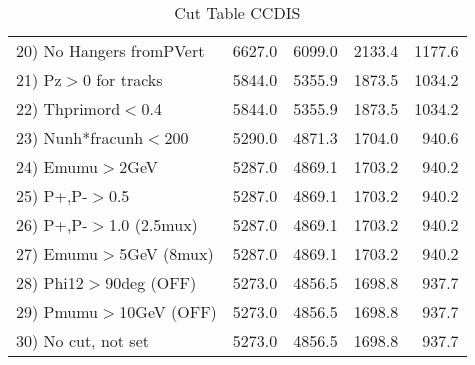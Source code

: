 \begin{table}[h!]
\begin{tabular}{||l||r|r|r|r||}
 20) No Hangers fromPVert &      6627.0 &      6099.0 &      2133.4 &      1177.6 \\
 21) Pz$>$0 for tracks    &      5844.0 &      5355.9 &      1873.5 &      1034.2 \\
 22) Thprimord$<$0.4      &      5844.0 &      5355.9 &      1873.5 &      1034.2 \\
 23) Nunh*fracunh$<$200   &      5290.0 &      4871.3 &      1704.0 &       940.6 \\
 24) Emumu$>$2GeV         &      5287.0 &      4869.1 &      1703.2 &       940.2 \\
 25) P+,P-$>$0.5          &      5287.0 &      4869.1 &      1703.2 &       940.2 \\
 26) P+,P-$>$1.0 (2.5mux) &      5287.0 &      4869.1 &      1703.2 &       940.2 \\
 27) Emumu$>$5GeV  (8mux) &      5287.0 &      4869.1 &      1703.2 &       940.2 \\
 28) Phi12$>$90deg  (OFF) &      5273.0 &      4856.5 &      1698.8 &       937.7 \\
 29) Pmumu$>$10GeV  (OFF) &      5273.0 &      4856.5 &      1698.8 &       937.7 \\
 30) No cut, not set      &      5273.0 &      4856.5 &      1698.8 &       937.7 \\
 \hline
 \hline
 \end{tabular}
 \caption{Cut Table  CCDIS  }
 \label{tab-cut_ccdis}
 \end{table}
